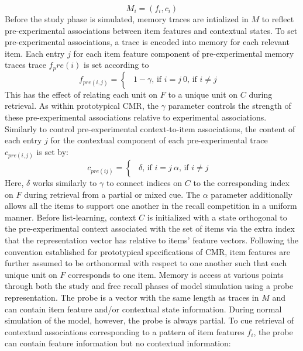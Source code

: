 {}$$M_i = (f_i, c_i)$$\markdownRendererInterblockSeparator
{}\markdownRendererInterblockSeparator
{}Before the study phase is simulated, memory traces are intialized in $M$ to reflect pre-experimental associations between item features and contextual states. To set pre-experimental associations, a trace is encoded into memory for each relevant item. Each entry $j$ for each item feature component of pre-experimental memory traces trace $f_pre(i)$ is set according to\markdownRendererInterblockSeparator
{}$$f_{pre(i, j)} = \begin{cases} \begin{alignedat}{2} 1 - \gamma \text{, if } i=j \ 0 \text{, if } i \neq j\ \end{alignedat} \end{cases}$$\markdownRendererInterblockSeparator
{}This has the effect of relating each unit on $F$ to a unique unit on $C$ during retrieval. As within prototypical CMR, the $\gamma$ parameter controls the strength of these pre-experimental associations relative to experimental associations.\markdownRendererInterblockSeparator
{}Similarly to control pre-experimental context-to-item associations, the content of each entry $j$ for the contextual component of each pre-experimental trace $c_{pre(i,j)}$ is set by:\markdownRendererInterblockSeparator
{}$$c_{pre(ij)} = \begin{cases} \begin{alignedat}{2} \delta \text{, if } i=j \ \alpha \text{, if } i \neq j\ \end{alignedat} \end{cases}$$\markdownRendererInterblockSeparator
{}Here, $\delta$ works similarly to $\gamma$ to connect indices on $C$ to the corresponding index on $F$ during retrieval from a partial or mixed cue. The $\alpha$ parameter additionally allows all the items to support one another in the recall competition in a uniform manner.\markdownRendererInterblockSeparator
{}Before list-learning, context $C$ is initialized with a state orthogonal to the pre-experimental context associated with the set of items via the extra index that the representation vector has relative to items' feature vectors. Following the convention established for prototypical specifications of CMR, item features are further assumed to be orthonormal with respect to one another such that each unique unit on $F$ corresponds to one item.\markdownRendererInterblockSeparator
{}\markdownRendererInterblockSeparator
{}Memory is access at various points through both the study and free recall phases of model simulation using a probe representation. The probe is a vector with the same length as traces in $M$ and can contain item feature and/or contextual state information. During normal simulation of the model, however, the probe is always partial. To cue retrieval of contextual associations corresponding to a pattern of item features $f_i$, the probe can contain feature information but no contextual information:\markdownRendererInterblockSeparator
